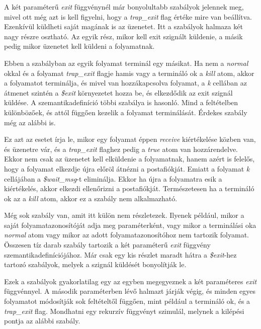A két paraméterű \textit{exit} függvénynél már bonyolultabb szabályok jelennek meg, mivel ott még azt is kell figyelni, hogy a \textit{trap\_exit} flag értéke mire van beállítva. Ezenkívül küldheti saját magának is az üzenetet. Itt a szabályok halmaza két nagy részre osztható. Az egyik rész, mikor kell exit szignált küldenie, a másik pedig mikor üzenetet kell küldeni a folyamatnak.



Ebben a szabályban az egyik folyamat terminál egy másikat. Ha nem a \textit{normal} okkal és a folyamat \textit{trap\_exit} flagje hamis vagy a termináló ok a \textit{kill} atom, akkor a folyamatot terminálja, és mivel van hozzákapcsolva folyamat, a \textit{k} cellában az átmenet szintén a \textit{\$exit} környezetet hozza be, és elkezdődik az exit szignál küldése. A szemantikadefiníció többi szabálya is hasonló. Mind a feltételben különbözőek, és attól függően kezelik a folyamat terminálását. Érdekes szabály még az alábbi is.



Ez azt az esetet írja le, mikor egy folyamat éppen \textit{receive} kiértékelése közben van, és üzenetre vár, és a \textit{trap\_exit} flaghez pedig a \textit{true} atom van hozzárendelve. Ekkor nem csak az üzenetet kell elküldenie a folyamatnak, hanem azért is felelős, hogy a folyamat elkezdje újra előröl átnézni a postafiókját. Emiatt a folyamat \textit{k} cellájában a \textit{\$wait\_msg}-t eliminálja. Ekkor ha újra a folyamatra esik a kiértékelés, akkor elkezdi ellenőrizni a postafiókját. Természetesen ha a termináló ok az a \textit{kill} atom, akkor ez a szabály nem alkalmazható.

Még sok szabály van, amit itt külön nem részletezek. Ilyenek például, mikor a saját folyamatazonosítóját adja meg paraméterként, vagy mikor a terminálási oka \textit{normal}  atom vagy mikor az adott folyamatazonosítóhoz nem tartozik folyamat. Összesen tíz darab szabály tartozik a két paraméterű \textit{exit} függvény szemantikadefiníciójához. Már csak egy kis részlet maradt hátra a \textit{\$exit}-hez tartozó szabályok, melyek a szignál küldését bonyolítják le.

Ezek a szabályok gyakorlatilag egy az egyben megegyeznek a két paraméteres \textit{exit} függvénnyel. A második paraméterben lévő halmazt járják végig, és minden egyes folyamatot módosítják sok feltételtől függően, mint például a termináló ok, és a \textit{trap\_exit} flag. Mondhatni egy rekurzív függvényt szimulál, melynek a kilépési pontja az alábbi szabály.

